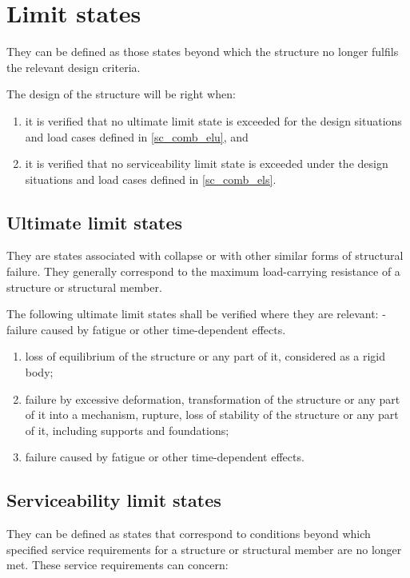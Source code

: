 \section{Limit states} \label{sc_el}
They can be defined as those states beyond which the structure no longer fulfils the relevant design criteria.

The design of the structure will be right when:

\begin{enumerate}
\item it is verified that no ultimate limit state is exceeded for the design situations and load cases defined in \ref{sc_comb_elu}, and
\item it is verified that no serviceability limit state is exceeded under the design situations and load cases defined in \ref{sc_comb_els}.
\end{enumerate}

\subsection{Ultimate limit states}
They are states associated with collapse or with other similar forms of structural failure. They generally correspond to the maximum load-carrying resistance of a structure or structural member.

The following ultimate limit states shall be verified where they are relevant:
- 
failure caused by fatigue or other time-dependent effects.


\begin{enumerate}
\item loss of equilibrium of the structure or any part of it, considered as a rigid body;
\item failure by excessive deformation, transformation of the structure or any part of it into a mechanism, rupture, loss of stability of the structure or any part of it, including supports and foundations;
\item failure caused by fatigue or other time-dependent effects.
\end{enumerate}

\subsection{Serviceability limit states}
They can be defined as states that correspond to conditions beyond which specified service requirements for a
structure or structural member are no longer met. These service requirements can concern:


